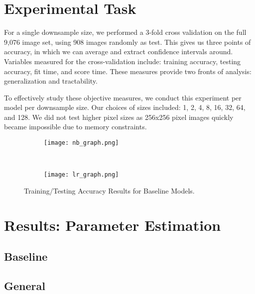 \documentclass{article}
\begin{document}



\section{Experimental Task}
\label{sec:task}
For a single downsample size, we performed a 3-fold cross validation on
the full 9,076 image set, using 908
images randomly as test. This gives us three points of accuracy, in which we
can average and extract confidence intervals around. Variables measured for the
cross-validation include: training accuracy, testing accuracy, fit time, and
score time. These measures provide two fronts of analysis: generalization and
tractability.

To effectively study these objective measures, we conduct this experiment
per model per downsample size. Our choices of sizes
included: 1, 2, 4, 8, 16, 32, 64, and 128. We did not test higher pixel sizes
as 256x256 pixel images quickly became impossible due to memory constraints.

\begin{figure}
  \centering
  \begin{subfigure}[b]{0.47\textwidth}
    \centering
    \texttt{[image: nb\_graph.png]}
    \caption*{}
    \label{fig:nb_graph}
  \end{subfigure}
  ~
  \begin{subfigure}[b]{0.47\textwidth}
    \centering
    \texttt{[image: lr\_graph.png]}
    \caption*{}
    \label{fig:lr_graph}
  \end{subfigure}
  \vspace{-10pt}
  \caption{Training/Testing Accuracy Results for Baseline Models.}
\end{figure}

\section{Results: Parameter Estimation}
\label{sec:results-param}
\subsection{Baseline}
\subsection{General}
\end{document}
